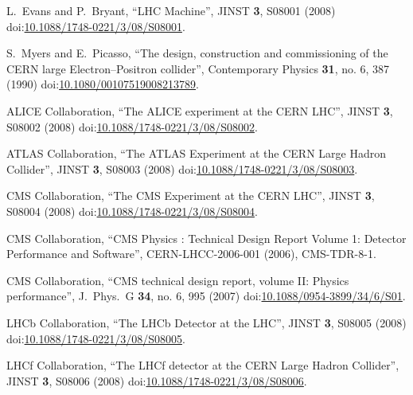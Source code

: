 \begin{thebibliography}{99}




L.~Evans and P.~Bryant, ``LHC Machine'', JINST {\bf 3}, S08001 (2008) doi:\href{http://dx.doi.org/10.1088/1748-0221/3/08/S08001}{10.1088/1748-0221/3/08/S08001}.

S.~Myers and E.~Picasso, ``The design, construction and commissioning of the CERN large Electron–Positron collider'', Contemporary Physics {\bf 31}, no. 6, 387 (1990) doi:\href{https://doi.org/10.1080/00107519008213789}{10.1080/00107519008213789}.

ALICE Collaboration, ``The ALICE experiment at the CERN LHC'', JINST {\bf 3}, S08002 (2008) doi:\href{http://dx.doi.org/10.1088/1748-0221/3/08/S08002}{10.1088/1748-0221/3/08/S08002}.

ATLAS Collaboration, ``The ATLAS Experiment at the CERN Large Hadron Collider'', JINST {\bf 3}, S08003 (2008) doi:\href{http://dx.doi.org/10.1088/1748-0221/3/08/S08003}{10.1088/1748-0221/3/08/S08003}.

CMS Collaboration, ``The CMS Experiment at the CERN LHC'', JINST {\bf 3}, S08004 (2008) doi:\href{http://dx.doi.org/10.1088/1748-0221/3/08/S08004}{10.1088/1748-0221/3/08/S08004}.

CMS Collaboration, ``CMS Physics : Technical Design Report Volume 1: Detector Performance and Software'', CERN-LHCC-2006-001 (2006), CMS-TDR-8-1. 

CMS Collaboration, ``CMS technical design report, volume II: Physics performance'', J.\ Phys.\ G {\bf 34}, no. 6, 995 (2007) doi:\href{http://dx.doi.org/10.1088/0954-3899/34/6/S01}{10.1088/0954-3899/34/6/S01}.

LHCb Collaboration, ``The LHCb Detector at the LHC'', JINST {\bf 3}, S08005 (2008) doi:\href{http://dx.doi.org/10.1088/1748-0221/3/08/S08005}{10.1088/1748-0221/3/08/S08005}.

LHCf Collaboration, ``The LHCf detector at the CERN Large Hadron Collider'', JINST {\bf 3}, S08006 (2008) doi:\href{http://dx.doi.org/10.1088/1748-0221/3/08/S08006}{10.1088/1748-0221/3/08/S08006}.


\end{thebibliography}
